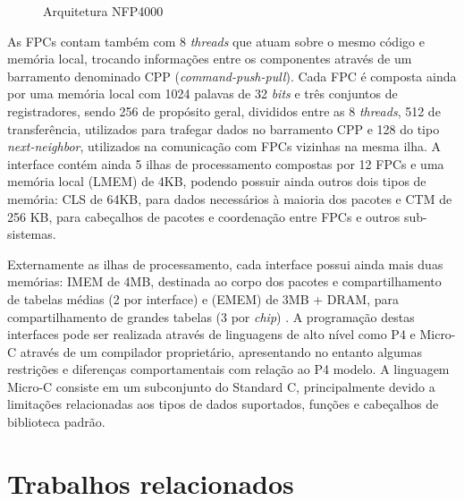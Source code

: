 \documentclass[12pt]{article}
\begin{document}
\begin{figure}[!t]
\centering
{}
\caption{Arquitetura NFP4000}
\label{fig:nfp_arquitetura}
\end{figure}

As FPCs contam também com 8 \textit{threads} que atuam sobre o mesmo código e memória local, trocando informações entre os componentes através de um barramento denominado CPP (\textit{command-push-pull}). Cada FPC é composta ainda por uma memória local com 1024 palavas de 32 \textit{bits} e três conjuntos de registradores, sendo 256 de propósito geral, divididos entre as 8 \textit{threads}, 512 de transferência, utilizados para trafegar dados no barramento CPP e 128 do tipo \textit{next-neighbor}, utilizados na comunicação com FPCs vizinhas na mesma ilha. A interface contém ainda 5 ilhas de processamento compostas por 12 FPCs e uma memória local (LMEM) de 4KB, podendo possuir ainda outros dois tipos de memória: CLS de 64KB, para dados necessários à maioria dos pacotes e CTM de 256 KB, para cabeçalhos de pacotes e coordenação entre FPCs e outros sub-sistemas. 

Externamente as ilhas de processamento, cada interface possui ainda mais duas memórias: IMEM de 4MB, destinada ao corpo dos pacotes e compartilhamento de tabelas médias (2 por interface) e (EMEM) de 3MB + DRAM, para compartilhamento de grandes tabelas (3 por \textit{chip}) \cite{nfp4000_20}. A programação destas interfaces pode ser realizada através de linguagens de alto nível como P4 e Micro-C através de um compilador proprietário, apresentando no entanto algumas restrições e diferenças comportamentais com relação ao P4 modelo. A linguagem Micro-C consiste em um subconjunto do Standard C, principalmente devido a limitações relacionadas aos tipos de dados suportados, funções e cabeçalhos de biblioteca padrão.

\section{Trabalhos relacionados} \label{sec:tr}
\end{document}
